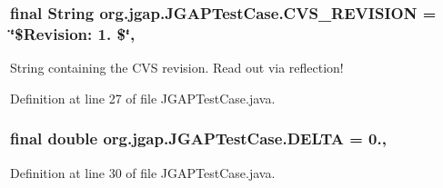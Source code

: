\hypertarget{classorg_1_1jgap_1_1_j_g_a_p_test_case_aa1538916825683cb0b47f41c6fd7386e}{
\subsubsection[{C\-V\-S\-\_\-\-R\-E\-V\-I\-S\-I\-O\-N}]{\setlength{\rightskip}{0pt plus 5cm}final String org.\-jgap.\-J\-G\-A\-P\-Test\-Case.\-C\-V\-S\-\_\-\-R\-E\-V\-I\-S\-I\-O\-N = \char`\"{}\$Revision\-: 1. \$\char`\"{}\hspace{0.3cm}{\ttfamily [static]}, {\ttfamily [private]}}}\label{classorg_1_1jgap_1_1_j_g_a_p_test_case_aa1538916825683cb0b47f41c6fd7386e}
String containing the C\-V\-S revision. Read out via reflection! 

Definition at line 27 of file J\-G\-A\-P\-Test\-Case.\-java.

\hypertarget{classorg_1_1jgap_1_1_j_g_a_p_test_case_a9526215e5c49deb8f2811944f050d30b}{
\subsubsection[{D\-E\-L\-T\-A}]{\setlength{\rightskip}{0pt plus 5cm}final double org.\-jgap.\-J\-G\-A\-P\-Test\-Case.\-D\-E\-L\-T\-A = 0.\hspace{0.3cm}{\ttfamily [static]}, {\ttfamily [protected]}}}\label{classorg_1_1jgap_1_1_j_g_a_p_test_case_a9526215e5c49deb8f2811944f050d30b}


Definition at line 30 of file J\-G\-A\-P\-Test\-Case.\-java.



